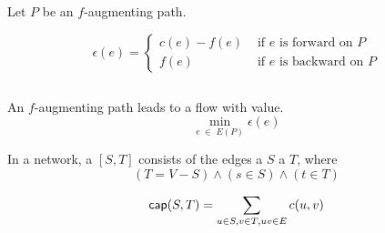 \begin{frame}{}
  \begin{definition}
    Let $P$ be an $f$-augmenting path.

    \[
      \epsilon(e) = \begin{cases}
        c(e) - f(e) & \text{ if } e \text{ is forward on } P \\
        f(e)        & \text{ if } e \text{ is backward on } P
      \end{cases}
    \]
  \end{definition}

  \begin{columns}
  \end{columns}

  \pause
  \vspace{0.30cm}
  \begin{center}
    An $f$-augmenting path leads to a flow with  value.
    \[
      \min_{e \;\in\; E(P)} \epsilon(e)
    \]
  \end{center}
\end{frame}

\begin{frame}{}

  \pause
  \vspace{0.30cm}
\end{frame}

\begin{frame}{}
  \begin{definition}
    In a network, a  $[S, T]$
    consists of the edges  a  $S$
     a  $T$, where
    \[
      (T = V - S) \land (s \in S) \land (t \in T)
    \]
  \end{definition}

  \vspace{0.50cm}
\end{frame}

\begin{frame}{}

  \begin{definition}
    \[
      \textsf{cap}(S, T) = \sum_{u \in S, v \in T, uv \in E} c(u, v)
    \]
  \end{definition}
\end{frame}

